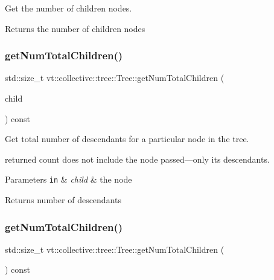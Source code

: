 Get the number of children nodes. 

\begin{DoxyReturn}{Returns}
the number of children nodes 
\end{DoxyReturn}
\mbox{\label{structvt_1_1collective_1_1tree_1_1_tree_ac387d211dbc2689a216a3b99bc332507}} 
\subsubsection{\texorpdfstring{get\+Num\+Total\+Children()}{getNumTotalChildren()}\hspace{0.1cm}{\footnotesize\ttfamily [1/2]}}
{\footnotesize\ttfamily std\+::size\+\_\+t vt\+::collective\+::tree\+::\+Tree\+::get\+Num\+Total\+Children (\begin{DoxyParamCaption}\item[{\hyperlink{namespacevt_a866da9d0efc19c0a1ce79e9e492f47e2}{Node\+Type}}]{child }\end{DoxyParamCaption}) const}



Get total number of descendants for a particular node in the tree. 

returned count does not include the node passed---only its descendants.


\begin{DoxyParams}[1]{Parameters}
\mbox{\tt in}  & {\em child} & the node\\
\hline
\end{DoxyParams}
\begin{DoxyReturn}{Returns}
number of descendants 
\end{DoxyReturn}
\mbox{\label{structvt_1_1collective_1_1tree_1_1_tree_a294b7827285c140d412a4344f3b135d5}} 
\subsubsection{\texorpdfstring{get\+Num\+Total\+Children()}{getNumTotalChildren()}\hspace{0.1cm}{\footnotesize\ttfamily [2/2]}}
{\footnotesize\ttfamily std\+::size\+\_\+t vt\+::collective\+::tree\+::\+Tree\+::get\+Num\+Total\+Children (\begin{DoxyParamCaption}{ }\end{DoxyParamCaption}) const}



